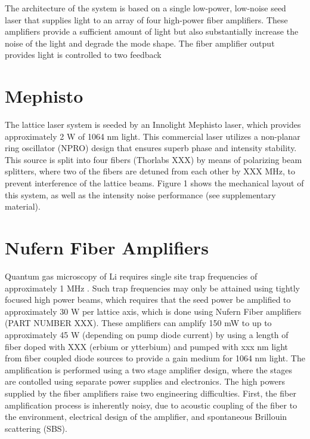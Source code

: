 \documentclass[twocolumn,aps,pra,showpacs,preprintnumbers,bibnotes]{revtex4-1}
\begin{document}
The architecture of the system is based on a single low-power, low-noise seed laser that supplies light to an array of four high-power fiber amplifiers.
These amplifiers provide a sufficient amount of light but also substantially increase the noise of the light and degrade the mode shape. 
The fiber amplifier output provides light is controlled to two feedback 

\section{Mephisto}
The lattice laser system is seeded by an Innolight Mephisto laser, which provides approximately 2 W of 1064 nm light. 
This commercial laser utilizes a non-planar ring oscillator (NPRO) design that ensures superb phase and intensity stability. This source is split into four fibers (Thorlabs XXX) by means of polarizing beam splitters, where two of the fibers are detuned from each other by XXX MHz, to prevent interference of the lattice beams. Figure 1 shows the mechanical layout of this system, as well as the intensity noise performance (see supplementary material).


\section{Nufern Fiber Amplifiers}
Quantum gas microscopy of Li requires single site trap frequencies of approximately 1 MHz \cite{single site paper}.
Such trap frequencies may only be attained using tightly focused high power beams, which requires that the seed power be amplified to approximately 30 W per lattice axis, which is done using Nufern Fiber amplifiers (PART NUMBER XXX).
These amplifiers can amplify 150 mW to up to approximately 45 W (depending on pump diode current) by using a length of fiber doped with XXX (erbium or ytterbium) and pumped with xxx nm light from fiber coupled diode sources to provide a gain medium for 1064 nm light. 
The amplification is performed using a two stage amplifier design, where the stages are contolled using separate power supplies and electronics.
The high powers supplied by the fiber amplifiers raise two engineering difficulties. First, the fiber amplification process is inherently noisy, due to acoustic coupling of the fiber to the environment, electrical design of the amplifier, and spontaneous Brillouin scattering (SBS). 
\end{document}
